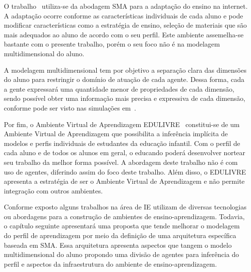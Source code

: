 O trabalho~\cite{geyer2001semeai} utiliza-se da abodagem SMA para a adaptação do ensino na internet. A adaptação ocorre conforme as características individuais de cada aluno e pode modificar características como a estratégia de ensino, seleção de materiais que são mais adequados ao aluno de acordo com o seu perfil. Este ambiente assemelha-se bastante com o presente trabalho, porém o seu foco não é na modelagem multidimensional do aluno.

A modelagem multidimensional tem por objetivo a separação clara das dimensões do aluno para restringir o domínio de atuação de cada agente. Dessa forma, cada a gente expressará uma quantidade menor de propriedades de cada dimensão, sendo possível obter uma informação mais precisa e expressiva de cada dimensão, conforme pode ser visto nas simulações em~\cite{helbing11}.

Por fim, o Ambiente Virtual de Aprendizagem EDULIVRE~\cite{rabelo2010identificacao} constitui-se de um Ambiente Virtual de Aprendizagem que possibilita a inferência implícita de modelos e perfis individuais de estudantes da educação infantil. Com o perfil de cada aluno e de todos os alunos em geral, o educando poderá desenvolver nortear seu trabalho da melhor forma possível. A abordagem deste trabalho não é com uso de agentes, diferindo assim do foco deste trabalho. Além disso, o EDULIVRE apresenta a estratégia de ser o Ambiente Virtual de Aprendizagem e não permite integração com outros ambientes.

Conforme exposto alguns trabalhos na área de IE utilizam de diversas tecnologias ou abordagens para a construção de ambientes de ensino-aprendizagem. Todavia, o capítulo seguinte apresentará uma proposta que tende melhorar o modelagem do perfil de aprendizagem por meio da definição de uma arquitetura específica baseada em SMA. Essa arquitetura apresenta aspectos que tangem o modelo multidimensional do aluno propondo uma divisão de agentes para inferência do perfil e aspectos da infraestrutura do ambiente de ensino-aprendizagem.













